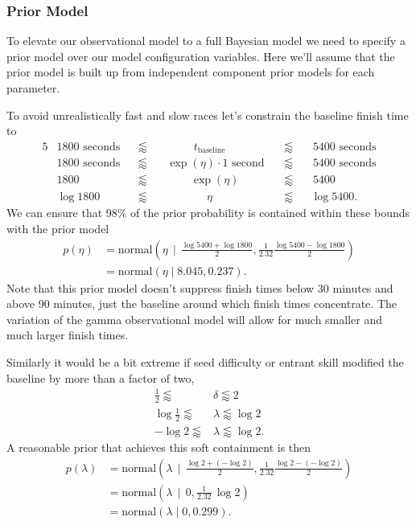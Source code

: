 \documentclass[
  letterpaper,
  DIV=11,
  numbers=noendperiod]{scrartcl}
\begin{document}
\subsubsection{Prior Model}\label{prior-model}

To elevate our observational model to a full Bayesian model we need to
specify a prior model over our model configuration variables. Here we'll
assume that the prior model is built up from independent component prior
models for each parameter.

To avoid unrealistically fast and slow races let's constrain the
baseline finish time to \begin{alignat*}{5}
& 1800 \text{ seconds} &
& \lessapprox &
& \quad\quad\;\; t_{\mathrm{baseline}} &
& \lessapprox &
& \, 5400 \text{ seconds}
\\
& 1800 \text{ seconds} &
& \lessapprox &
& \, \exp(\eta) \cdot 1 \text{ second} \, &
& \lessapprox &
& \, 5400 \text{ seconds}
\\
& 1800 &
& \lessapprox &
& \quad\quad\; \exp(\eta) &
& \lessapprox &
& \, 5400
\\
& \log 1800 &
& \lessapprox &
& \quad\quad\quad\;\;\, \eta &
& \lessapprox &
& \log 5400.
\end{alignat*} We can ensure that 98\% of the prior probability is
contained within these bounds with the prior model \begin{align*}
p( \eta )
&=
\text{normal} \left(
\eta \;\, \bigg| \;\, \frac{\log 5400 + \log 1800}{2},
                        \frac{1}{2.32} \frac{\log 5400 - \log 1800}{2} \right)
\\
&= \text{normal}( \eta \mid 8.045, 0.237).
\end{align*} Note that this prior model doesn't suppress finish times
below 30 minutes and above 90 minutes, just the baseline around which
finish times concentrate. The variation of the gamma observational model
will allow for much smaller and much larger finish times.

Similarly it would be a bit extreme if seed difficulty or entrant skill
modified the baseline by more than a factor of two, \begin{align*}
\frac{1}{2} \lessapprox &\delta \lessapprox 2
\\
\log \frac{1}{2} \lessapprox &\lambda \lessapprox \log 2
\\
- \log 2 \lessapprox &\lambda \lessapprox \log 2.
\end{align*} A reasonable prior that achieves this soft containment is
then \begin{align*}
p( \lambda )
&=
\text{normal} \left(
\lambda \;\, \bigg| \;\, \frac{\log 2 + (-\log 2)}{2},
                         \frac{1}{2.32} \frac{\log 2 - (-\log 2)}{2} \right)
\\
&=
\text{normal} \left(
\lambda \;\, \bigg| \;\, 0, \frac{1}{2.32} \, \log 2\right)
\\
&= \text{normal}( \lambda \mid 0, 0.299).
\end{align*}
\end{document}
